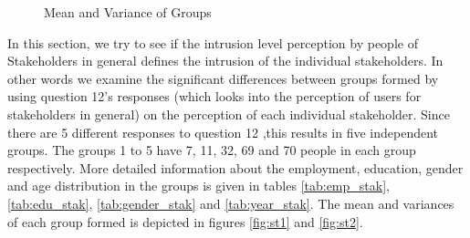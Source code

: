 \begin{figure}[htp]
\caption{Mean and Variance of Groups}
\label{fig:st3}
\end{figure}

In this section, we try to see if the intrusion level perception by people of Stakeholders in general defines the intrusion of the individual stakeholders. In other words we examine the significant differences between groups formed by using question 12's responses (which looks into the perception of users for stakeholders in general) on the perception of
each individual stakeholder. Since there are 5 different responses to question 12 ,this results in five independent groups. The groups 1 to 5 have 7, 11, 32, 69 and 70 people in each group respectively. More detailed information about the employment, education, gender and age distribution in the groups is given in tables \ref{tab:emp_stak}, \ref{tab:edu_stak}, \ref{tab:gender_stak} and \ref{tab:year_stak}. The mean and variances of each group formed is depicted in figures \ref{fig:st1} and \ref{fig:st2}.

